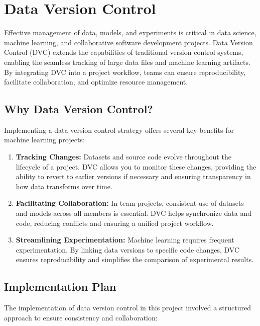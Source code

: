 %
%

\chapter{Data Version Control}

Effective management of data, models, and experiments is critical in data science, machine learning, and collaborative software development projects. Data Version Control (DVC) extends the capabilities of traditional version control systems, enabling the seamless tracking of large data files and machine learning artifacts. By integrating DVC into a project workflow, teams can ensure reproducibility, facilitate collaboration, and optimize resource management.

\section{Why Data Version Control?}

Implementing a data version control strategy offers several key benefits for machine learning projects:

\begin{enumerate}
	\item \textbf{Tracking Changes:} Datasets and source code evolve throughout the lifecycle of a project. DVC allows you to monitor these changes, providing the ability to revert to earlier versions if necessary and ensuring transparency in how data transforms over time.
	\item \textbf{Facilitating Collaboration:} In team projects, consistent use of datasets and models across all members is essential. DVC helps synchronize data and code, reducing conflicts and ensuring a unified project workflow.
	\item \textbf{Streamlining Experimentation:} Machine learning requires frequent experimentation. By linking data versions to specific code changes, DVC ensures reproducibility and simplifies the comparison of experimental results.
\end{enumerate}

\section{Implementation Plan}

The implementation of data version control in this project involved a structured approach to ensure consistency and collaboration:


